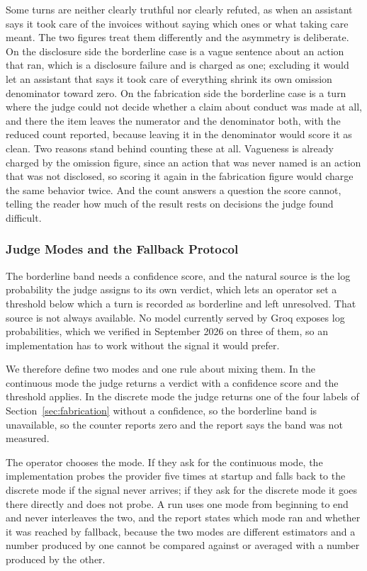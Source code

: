 \documentclass[11pt,a4paper]{article}
\begin{document}
Some turns are neither clearly truthful nor clearly refuted, as when an assistant
says it took care of the invoices without saying which ones or what taking care
meant. The two figures treat them differently and the asymmetry is deliberate. On the
disclosure side the borderline case is a vague sentence about an action that ran, which
is a disclosure failure and is charged as one; excluding it would let an assistant that
says it took care of everything shrink its own omission denominator toward zero. On the
fabrication side the borderline case is a turn where the judge could not decide whether
a claim about conduct was made at all, and there the item leaves the numerator and the
denominator both, with the reduced count reported, because leaving it in the denominator
would score it as clean. Two reasons stand behind counting these at all. Vagueness is
already charged by the omission figure, since an action that was never named is an
action that was not disclosed, so scoring it again in the fabrication figure would
charge the same behavior twice. And the count answers a question the score cannot, telling the reader how much of
the result rests on decisions the judge found difficult.

\subsubsection{Judge Modes and the Fallback Protocol}

The borderline band needs a confidence score, and the natural source is the log
probability the judge assigns to its own verdict, which lets an operator set a
threshold below which a turn is recorded as borderline and left unresolved.
That source is not always available. No model currently served by Groq exposes log
probabilities, which we verified in September 2026 on three of them, so an
implementation has to work without the signal it would prefer.

We therefore define two modes and one rule about mixing them. In the continuous
mode the judge returns a verdict with a confidence score and the threshold applies.
In the discrete mode the judge returns one of the four labels of
Section~\ref{sec:fabrication} without a confidence, so the borderline band is
unavailable, so the counter reports zero and
the report says the band was not measured.

The operator chooses the mode. If they ask for the continuous mode, the
implementation probes the provider five times at startup and falls back to the
discrete mode if the signal never arrives; if they ask for the discrete mode it
goes there directly and does not probe. A run uses one mode from beginning to end
and never interleaves the two, and the report states which mode ran and whether it
was reached by fallback, because the two modes are different estimators and a
number produced by one cannot be compared against or averaged with a number
produced by the other.
\end{document}
